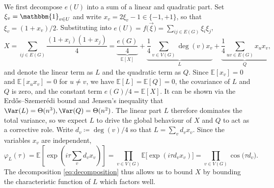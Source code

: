 We first decompose $e(U)$ into a sum of a linear and quadratic part. Set $\xi_v = \mathbbm{1}_{v \in U}$ and write $x_v = 2\xi_v - 1 \in \{-1, +1\}$, so that $\xi_v = (1 + x_v)/2$. Substituting into $e(U) = f\bigl(\vec\xi\bigr) = \sum_{ij \in E(G)} \xi_i \xi_j$,
\begin{equation}\label{eq:decomposition}
  X = \sum_{ij \in E(G)} \frac{(1 + x_i)(1 + x_j)}{4} = \underbrace{\frac{e(G)}{4}}_{\mathbb{E}[X]} + \underbrace{\frac{1}{4}\sum_{v \in V(G)} \deg(v) x_v}_{L} + \underbrace{\frac{1}{4}\sum_{uv \in E(G)} x_u x_v}_{Q},
\end{equation}
and denote the linear term as $L$ and the quadratic term as $Q$. Since $\mathbb{E}[x_v] = 0$ and $\mathbb{E}[x_u x_v] = 0$ for $u \ne v$, we have $\mathbb{E}[L] = \mathbb{E}[Q] = 0$, the covariance of $L$ and $Q$ is zero, and the constant term $e(G)/4 = \mathbb{E}[X]$. It can be shown via the Erd\H{o}s--Szemer\'{e}di bound and Jensen's inequality that $\Var(L) = \Theta(n^3), \Var(Q) = \Theta(n^2)$.
The linear part $L$ therefore dominates the total variance, so we expect $L$ to drive the global behaviour of $X$ and $Q$ to act as a corrective role. Write $d_v \coloneqq \deg(v)/4$ so that $L = \sum_{v} d_v x_v$. Since the variables $x_v$ are independent,
\begin{equation}
  \label{eq:phi-L}
  \varphi_L(\tau) = \mathbb{E}\left[\exp\left(i\tau\sum_v d_v x_v\right)\right] = \prod_{v \in V(G)} \mathbb{E}\bigl[\exp(i\tau d_v x_v)\bigr] = \prod_{v \in V(G)} \cos\bigl(\tau d_v\bigr). 
\end{equation}
The decomposition \eqref{eq:decomposition} thus allows us to bound $X$ by bounding the characteristic function of $L$ which factors well. 

